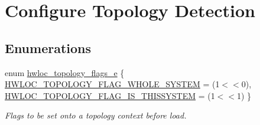 \hypertarget{group__hwlocality__configuration}{
\section{Configure Topology Detection}
\label{group__hwlocality__configuration}
}
\subsection*{Enumerations}
\begin{DoxyCompactItemize}
\item 
enum \hyperlink{group__hwlocality__configuration_gada025d3ec20b4b420f8038d23d6e7bde}{hwloc\_\-topology\_\-flags\_\-e} \{ \hyperlink{group__hwlocality__configuration_ggada025d3ec20b4b420f8038d23d6e7bdea129b4fea1300be22bbaf0bb0958994c8}{HWLOC\_\-TOPOLOGY\_\-FLAG\_\-WHOLE\_\-SYSTEM} =  (1$<$$<$0), 
\hyperlink{group__hwlocality__configuration_ggada025d3ec20b4b420f8038d23d6e7bdea6ecb6abc6a0bb75e81564f8bca85783b}{HWLOC\_\-TOPOLOGY\_\-FLAG\_\-IS\_\-THISSYSTEM} =  (1$<$$<$1)
 \}
\begin{DoxyCompactList}\small\item\em Flags to be set onto a topology context before load. \item\end{DoxyCompactList}\end{DoxyCompactItemize}
